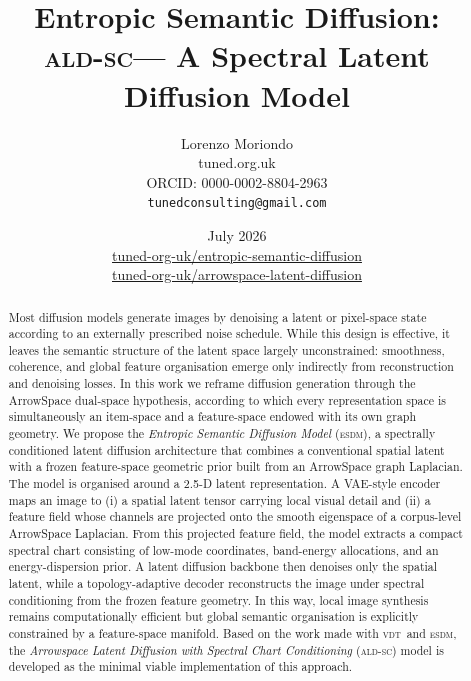 \documentclass[11pt]{article}
\newcommand{\ESDM}{\textsc{esdm}}
\newcommand{\ALDSC}{\textsc{ald-sc}}
\newcommand{\VDT}{\textsc{vdt}}
\begin{document}

\title{%
  \textbf{Entropic Semantic Diffusion:\\ \ALDSC --- A Spectral Latent Diffusion Model}
}

\author{%
  Lorenzo Moriondo \\[2pt]   \small tuned.org.uk\\   \small ORCID: 0000-0002-8804-2963\\   \texttt{tunedconsulting@gmail.com} }  \date{July 2026 \\ 
    \href{https://github.com/tuned-org-uk/entropic-semantic-diffusion}{%
     \textsc{\Large\faGithub} tuned-org-uk/entropic-semantic-diffusion} \\
     \href{https://github.com/tuned-org-uk/arrowspace-latent-diffusion}{%
     \textsc{\Large\faGithub} tuned-org-uk/arrowspace-latent-diffusion}
  }
    \maketitle  %
    \begin{abstract} %
    Most diffusion models generate images by denoising a latent or pixel-space state according to an externally prescribed noise schedule. While this design is effective, it leaves the semantic structure of the latent space largely unconstrained: smoothness, coherence, and global feature organisation emerge only indirectly from reconstruction and denoising losses. In this work we reframe diffusion generation through the ArrowSpace dual-space hypothesis, according to which every representation space is simultaneously an item-space and a feature-space endowed with its own graph geometry. We propose the \emph{Entropic Semantic Diffusion Model} (\ESDM), a spectrally conditioned latent diffusion architecture that combines a conventional spatial latent with a frozen feature-space geometric prior built from an ArrowSpace graph Laplacian.  The model is organised around a 2.5-D latent representation. A VAE-style encoder maps an image to (i) a spatial latent tensor carrying local visual detail and (ii) a feature field whose channels are projected onto the smooth eigenspace of a corpus-level ArrowSpace Laplacian. From this projected feature field, the model extracts a compact spectral chart consisting of low-mode coordinates, band-energy allocations, and an energy-dispersion prior. A latent diffusion backbone then denoises only the spatial latent, while a topology-adaptive decoder reconstructs the image under spectral conditioning from the frozen feature geometry. In this way, local image synthesis remains computationally efficient but global semantic organisation is explicitly constrained by a feature-space manifold.  Based on the work made with \VDT~and \ESDM, the \emph{Arrowspace Latent Diffusion with Spectral Chart Conditioning} (\ALDSC)  model is developed as the minimal viable implementation of this approach. 
    \end{abstract}  
    
\end{document}
